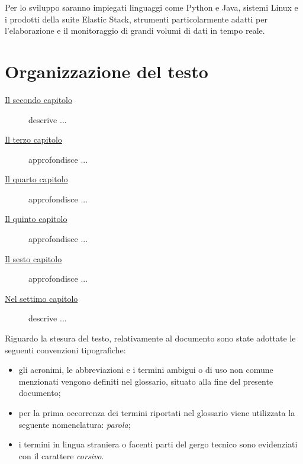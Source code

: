 Per lo sviluppo saranno impiegati linguaggi come Python e Java, sistemi Linux e i prodotti della suite Elastic Stack, strumenti particolarmente adatti per l'elaborazione e il monitoraggio di grandi volumi di dati in tempo reale.


\section{Organizzazione del testo}

\begin{description}
    \item[{\hyperref[cap:processi-metodologie]{Il secondo capitolo}}] descrive ...
    
    \item[{\hyperref[cap:descrizione-stage]{Il terzo capitolo}}] approfondisce ...
    
    \item[{\hyperref[cap:analisi-requisiti]{Il quarto capitolo}}] approfondisce ...
    
    \item[{\hyperref[cap:progettazione-codifica]{Il quinto capitolo}}] approfondisce ...
    
    \item[{\hyperref[cap:verifica-validazione]{Il sesto capitolo}}] approfondisce ...
    
    \item[{\hyperref[cap:conclusioni]{Nel settimo capitolo}}] descrive ...
\end{description}

Riguardo la stesura del testo, relativamente al documento sono state adottate le seguenti convenzioni tipografiche:
\begin{itemize}
	\item gli acronimi, le abbreviazioni e i termini ambigui o di uso non comune menzionati vengono definiti nel glossario, situato alla fine del presente documento;
	\item per la prima occorrenza dei termini riportati nel glossario viene utilizzata la seguente nomenclatura: \emph{parola}\glsfirstoccur;
	\item i termini in lingua straniera o facenti parti del gergo tecnico sono evidenziati con il carattere \emph{corsivo}.
\end{itemize}
